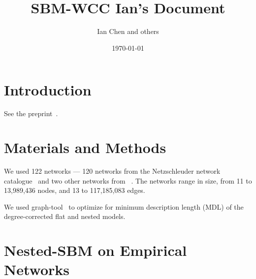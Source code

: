 \documentclass[aps,pre,superscriptaddress]{article}
\begin{document}

\title{SBM-WCC Ian's Document}
\author{Ian Chen and others}
\date{\today}
\maketitle

\section{Introduction}
See the preprint~\cite{Park25-02}.

\section{Materials and Methods}

We used 122 networks --- 120 networks from the Netzschleuder network catalogue~\cite{Netzschleuder} and two other networks from ~\cite{Park24-11}.
The networks range in size, from 11 to 13,989,436 nodes, and 13 to 117,185,083 edges.

We used graph-tool~\cite{graph-tool} to optimize for minimum description length (MDL) of the degree-corrected flat and nested models.

\section{Nested-SBM on Empirical Networks}
\end{document}

